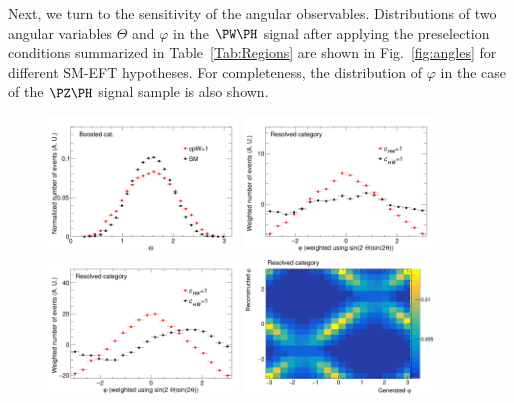 \documentclass[a4paper,11pt]{article}
\begin{document}
Next, we turn to the sensitivity of the angular observables. 
Distributions of two angular variables $\Theta$ and $\varphi$ in the $\PW\PH$ signal after applying the preselection conditions summarized in Table~\ref{Tab:Regions} are shown in Fig.~\ref{fig:angles} for different SM-EFT hypotheses. 
For completeness, the distribution of $\varphi$ in the case of the $\PZ\PH$ signal sample is also shown.
\begin{figure}[hbtp]
\begin{center}
\includegraphics[width=0.45\textwidth]{Figures/New/RECO/Boosted_Plot_Theta_WH.png}
\includegraphics[width=0.45\textwidth]{Figures/New/RECO/Resolved_Plot_phi_WH_CP.png}
\includegraphics[width=0.45\textwidth]{Figures/New/RECO/Resolved_Plot_phi_ZH_CP.png}
\includegraphics[width=0.45\textwidth]{Figures/New/RECO/Resolved_Plot_2D_phi_unweighted.png}

\end{center}
\end{figure}
\end{document}

